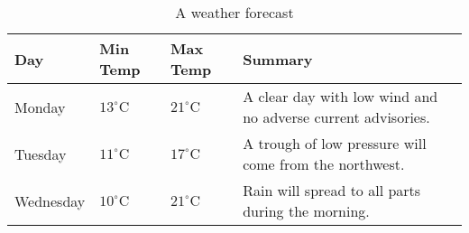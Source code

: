\begin{table}
    \begin{tabularx}{\textwidth}{lllX}
      \toprule
      Day & Min Temp & Max Temp & Summary \\
      \midrule
      Monday & $13^{\circ}\mathrm{C}$ & $21^\circ\mathrm{C}$ & A
      clear day with low wind and no adverse current advisories. \\
      Tuesday & $11^{\circ}\mathrm{C}$ & $17^\circ\mathrm{C}$ & A
      trough of low pressure will come from the northwest. \\
      Wednesday & $10^{\circ}\mathrm{C}$ &
      $21^\circ\mathrm{C}$ & Rain will spread to all parts during the
      morning. \\
      \bottomrule
    \end{tabularx}
    \caption{A weather forecast}
    \label{tab:weather}
  \end{table}
